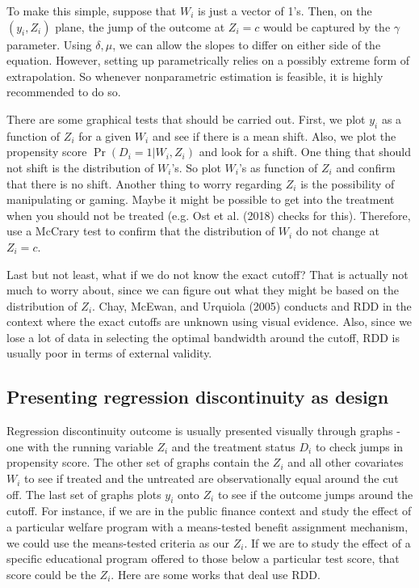 \documentclass[12pt]{article}
\theoremstyle{definition}
\theoremstyle{property}
\theoremstyle{assumption}
\theoremstyle{example}
\theoremstyle{comment}
\begin{document}
To make this simple, suppose that $W_i$ is just a vector of 1's. Then, on the $(y_i, Z_i)$ plane,  the jump of the outcome at $Z_i=c$ would be captured by the $\gamma$ parameter. Using $\delta, \mu$, we can allow the slopes to differ on either side of the equation. However, setting up parametrically relies on a possibly extreme form of extrapolation. So whenever nonparametric estimation is feasible, it is highly recommended to do so. \par
There are some graphical tests that should be carried out. First, we plot $y_i$ as a function of $Z_i$ for a given $W_i$ and see if there is a mean shift. Also, we plot the propensity score $\Pr(D_i=1|W_i, Z_i)$ and look for a shift. One thing that should not shift is the distribution of $W_i$'s. So plot $W_i$'s as function of $Z_i$ and confirm that there is no shift. Another thing to worry regarding $Z_i$ is the possibility of manipulating or gaming. Maybe it might be possible to get into the treatment when you should not be treated (e.g. Ost et al. (2018) checks for this). Therefore, use a McCrary test to confirm that the distribution of $W_i$ do not change at $Z_i=c$. \par
Last but not least, what if we do not know the exact cutoff? That is actually not much to worry about, since we can figure out what they might be based on the distribution of $Z_i$. Chay, McEwan, and Urquiola (2005) conducts and RDD in the context where the exact cutoffs are unknown using visual evidence. Also, since we lose a lot of data in selecting the optimal bandwidth around the cutoff, RDD is usually poor in terms of external validity.


\subsection{Presenting regression discontinuity as design}
Regression discontinuity outcome is usually presented visually through graphs - one with the running variable $Z_i$ and the treatment status $D_i$ to check jumps in propensity score. The other set of graphs contain the $Z_i$ and all other covariates $W_i$ to see if treated and the untreated are observationally equal around the cut off. The last set of graphs plots $y_i$ onto $Z_i$ to see if the outcome jumps around the cutoff. For instance, if we are in the public finance context and study the effect of a particular welfare program with a means-tested benefit assignment mechanism, we could use the means-tested criteria as our $Z_i$. If we are to study the effect of a specific educational program offered to those below a particular test score, that score could be the $Z_i$. Here are some works that deal use RDD. 
\end{document}
